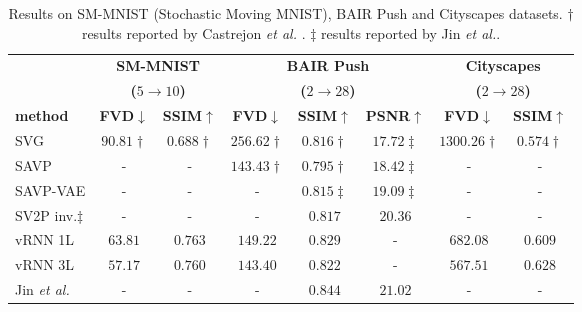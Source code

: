 \begin{table}[!t] 
	\centering
	\footnotesize
	\caption{Results on SM-MNIST (Stochastic Moving MNIST), BAIR Push and Cityscapes datasets. $\dag$ results reported by Castrejon \textit{et al.} \cite{Castrejon2019}. $\ddag$ results reported by Jin \textit{et al.}\cite{Jin2020}.}
	\label{table:results_stochastic}
	\begin{tabular} {@{}lccccccc@{}} 
		\toprule
		& \multicolumn{2}{c}{\textbf{SM-MNIST}} & \multicolumn{3}{c}{\textbf{BAIR Push}} & \multicolumn{2}{c}{\textbf{Cityscapes}} \\ 
		& \multicolumn{2}{c}{\textbf{($5\rightarrow10$)}} & \multicolumn{3}{c}{\textbf{($2\rightarrow28$)}} & \multicolumn{2}{c}{\textbf{($2\rightarrow28$)}} \\ 
		\cmidrule(lr){2-3} \cmidrule(lr){4-6} \cmidrule(lr){7-8} 
		\textbf{method} & \textbf{\acs{FVD}}$\downarrow$ & \textbf{\ac{SSIM}}$\uparrow$ & \textbf{\acs{FVD}}$\downarrow$ & \textbf{\ac{SSIM}}$\uparrow$ & \textbf{\acs{PSNR}}$\uparrow$ & \textbf{\acs{FVD}}$\downarrow$ & \textbf{\ac{SSIM}}$\uparrow$ \\
		\midrule
		\ac{SVG}\cite{Denton2018} & $90.81\dag$ & $0.688\dag$ & $256.62\dag$ & $0.816\dag$ & $17.72\ddag$ & $1300.26\dag$ & $0.574\dag$ \\
		\ac{SAVP}\cite{Lee2018} & - & - & $143.43\dag$ & $0.795\dag$ & $18.42\ddag$ & - & - \\
		\ac{SAVP}-VAE\cite{Lee2018} & - & - & - & $0.815\ddag$ & $19.09\ddag$ & - & - \\
		\ac{SV2P} inv.\cite{Babaeizadeh2018}$\ddag$ & - & - & - & $0.817$ & $20.36$ & - & - \\
		vRNN 1L \cite{Castrejon2019} & $63.81$ & $\mathbf{0.763}$ & $149.22$ & $0.829$ & - & $682.08$ & $0.609$ \\
		vRNN 3L \cite{Castrejon2019} & $\mathbf{57.17}$ & $0.760$ & $\mathbf{143.40}$ & $0.822$ & - & $\mathbf{567.51}$ & $\mathbf{0.628}$ \\
		Jin \textit{et al.}\cite{Jin2020} & - & - & - & $\mathbf{0.844}$ & $\mathbf{21.02}$ & - & - \\
		\bottomrule
	\end{tabular}
\end{table}

